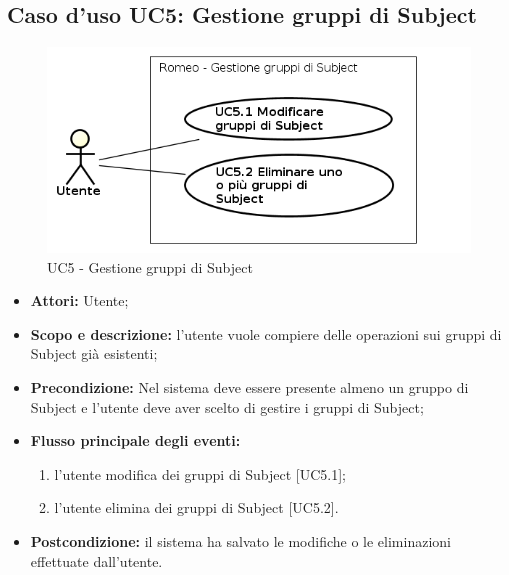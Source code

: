 \subsection{Caso d'uso UC5: Gestione gruppi di Subject}
\begin{figure}[!h]
\begin{center}
\includegraphics[scale=0.6]{./img/Use_Case/UC5}
\caption{UC5 - Gestione gruppi di Subject}
\end{center}
\end{figure}
\begin{itemize}
\item \textbf{Attori:} Utente;
\item \textbf{Scopo e descrizione:} l'utente vuole compiere delle operazioni sui gruppi di Subject\glossario{} già esistenti;
\item \textbf{Precondizione:} Nel sistema deve essere presente almeno un gruppo di Subject\glossario{} e l'utente deve aver scelto di gestire i gruppi di Subject\glossario{};
\item \textbf{Flusso principale degli eventi:}
\begin{enumerate}
\item l'utente modifica dei gruppi di Subject\glossario{} [UC5.1];
\item l'utente elimina dei gruppi di Subject\glossario{} [UC5.2].
\end{enumerate}
\item \textbf{Postcondizione:} il sistema ha salvato le modifiche o le eliminazioni effettuate dall'utente.
\end{itemize}

\pagebreak

